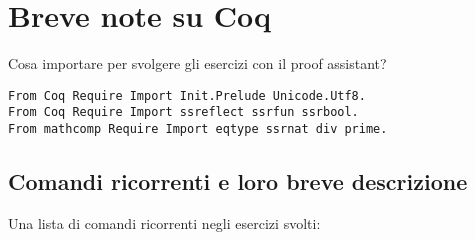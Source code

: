 \newpage

\section{Breve note su Coq}

Cosa importare per svolgere gli esercizi con il proof assistant?

\begin{lstlisting}[language=Coq]
From Coq Require Import Init.Prelude Unicode.Utf8.
From Coq Require Import ssreflect ssrfun ssrbool.
From mathcomp Require Import eqtype ssrnat div prime.
\end{lstlisting}

\subsection{Comandi ricorrenti e loro breve descrizione}

Una lista di comandi ricorrenti negli esercizi svolti:

